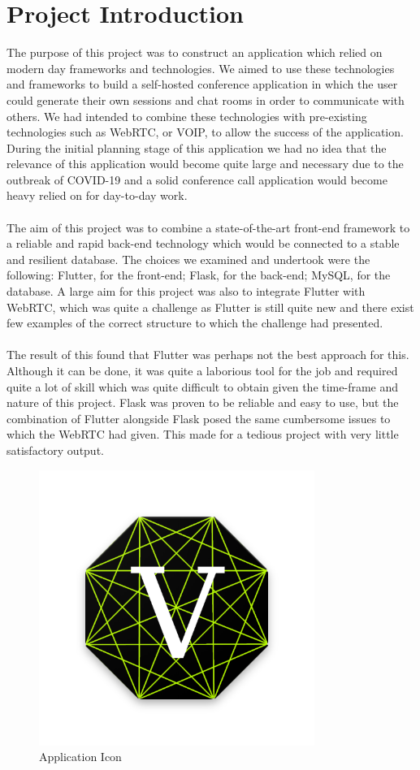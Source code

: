 \section{Project Introduction}
The purpose of this project was to construct an application which relied on modern day frameworks and technologies. We aimed to use these technologies and frameworks to build a self-hosted conference application in which the user could generate their own sessions and chat rooms in order to communicate with others. We had intended to combine these technologies with pre-existing technologies such as WebRTC, or VOIP, to allow the success of the application. During the initial planning stage of this application we had no idea that the relevance of this application would become quite large and necessary due to the outbreak of COVID-19 and a solid conference call application would become heavy relied on for day-to-day work.
\\\\ The aim of this project was to combine a state-of-the-art front-end framework to a reliable and rapid back-end technology which would be connected to a stable and resilient database. The choices we examined and undertook were the following: Flutter, for the front-end; Flask, for the back-end; MySQL, for the database. A large aim for this project was also to integrate Flutter with WebRTC, which was quite a challenge as Flutter is still quite new and there exist few examples of the correct structure to which the challenge had presented.
\\\\ The result of this found that Flutter was perhaps not the best approach for this. Although it can be done, it was quite a laborious tool for the job and required quite a lot of skill which was quite difficult to obtain given the time-frame and nature of this project. Flask was proven to be reliable and easy to use, but the combination of Flutter alongside Flask posed the same cumbersome issues to which the WebRTC had given. This made for a tedious project with very little satisfactory output. 
\begin{figure}[h!]
    \caption{Application Icon}
    \label{image:vertexChatLogo}
    \centering
    \includegraphics[width=0.8\textwidth]{images/vertexChatLogo.png}
\end{figure}